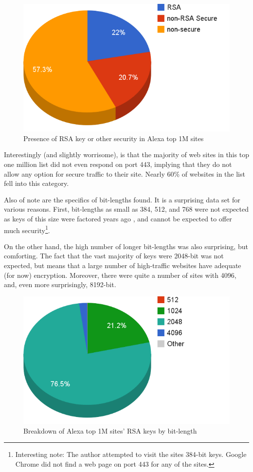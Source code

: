 \documentclass[smallextended]{svjour3}       %
\begin{document}
\begin{figure}
   \centering
   \includegraphics[width=0.75\linewidth]{cert_security}
   \caption{Presence of RSA key or other security in Alexa top 1M sites}
   \label{fig:certs}
\end{figure}

Interestingly (and slightly worrisome), is that the majority of web sites in
this top one million list did not even respond on port 443, implying that
they do not allow any option for secure traffic to their site. Nearly 60\% of
websites in the list fell into this category.

Also of note are the specifics of bit-lengths found. It is a surprising data
set for various reasons. First, bit-lengths as small as 384, 512, and 768 were
not expected as keys of this size were factored years ago
\cite{rsa2007challenge}, and cannot be expected to offer much
security\footnote{Interesting note: The author attempted to visit the sites
384-bit keys. Google Chrome did not find a web page on port 443 for any of
the sites.}.

On the other hand, the high number of longer bit-lengths was also surprising,
but comforting. The fact that the vast majority of keys were 2048-bit was not
expected, but means that a large number of high-traffic websites have adequate
(for now) encryption. Moreover, there were quite a number of sites with 4096,
and, even more surprisingly, 8192-bit.

\begin{figure}
   \centering
   \includegraphics[width=0.75\linewidth]{bit_length}
   \caption{Breakdown of Alexa top 1M sites' RSA keys by bit-length}
   \label{fig:bits}
\end{figure}
\end{document}
